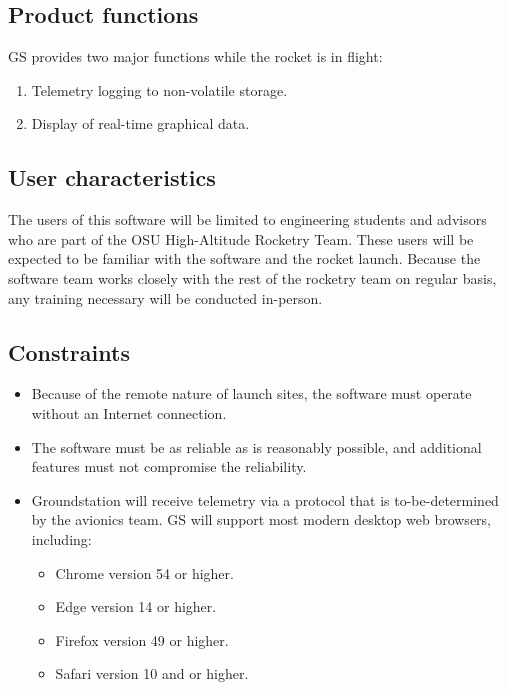 \documentclass[10pt,draftclsnofoot,onecolumn]{IEEEtran}
\begin{document}
	\subsection{Product functions}
	GS provides two major functions while the rocket is in flight:
	
	\begin{enumerate}
		\item Telemetry logging to non-volatile storage.
		\item Display of real-time graphical data. 
	\end{enumerate}
	
	\subsection{User characteristics}
	The users of this software will be limited to engineering students and advisors who are part of the OSU High-Altitude
	Rocketry Team.
	These users will be expected to be familiar with the software and the rocket launch.
	Because the software team works closely with the rest of the rocketry team on regular basis,
	any training necessary will be conducted in-person.
	
	\subsection{Constraints}
	\begin{itemize}
		\item Because of the remote nature of launch sites, the software must operate without an Internet connection.
		\item The software must be as reliable as is reasonably possible, and additional features must not compromise the reliability.
		\item Groundstation will receive telemetry via a protocol that is to-be-determined by the avionics team.	
	GS will support most modern desktop web browsers, including:
	\begin{itemize}
			\item Chrome version 54 or higher.
			\item Edge version 14 or higher.
			\item Firefox version 49 or higher.
			\item Safari version 10 and or higher.
		\end{itemize}
	
	\end{itemize}
\end{document}
